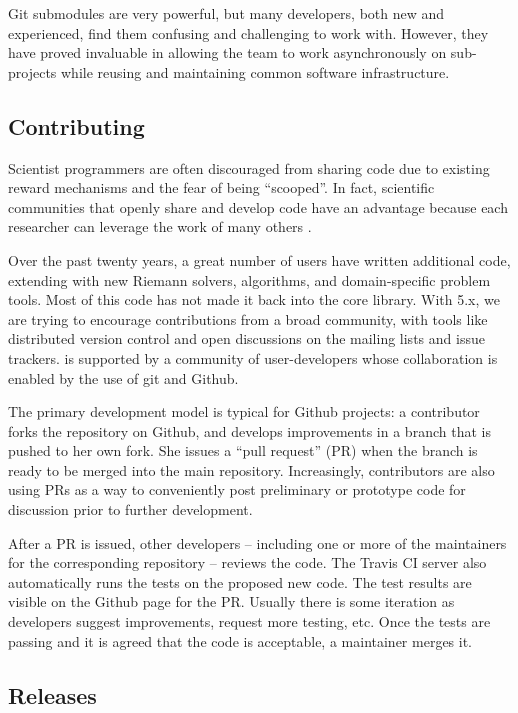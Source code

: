 Git submodules are very powerful, but many developers, both new and
experienced, find them confusing and challenging to work with.
However, they have proved invaluable in allowing the \clawpack team to
work asynchronously on sub-projects while reusing and maintaining
common software infrastructure.

\subsection{Contributing}


Scientist programmers are often discouraged from sharing code
due to existing reward mechanisms and the fear of being ``scooped''.
In fact, scientific communities that openly share and develop code
have an advantage because each researcher can leverage the work of
many others \cite{Turk:2013hd}.

Over the past twenty years, a great number of users have written
additional code, extending \clawpack with new Riemann solvers,
algorithms, and domain-specific problem tools.  Most of this code
has not made it back into the core library.  With \clawpack 5.x,
we are trying to encourage contributions from a broad community, with
tools like distributed version control and open discussions on 
the mailing lists and issue trackers.
\clawpack is supported by a community of user-developers whose
collaboration is enabled by the use of git and Github.



The primary development model
is typical for Github projects: a contributor forks the repository on Github,
and develops improvements in a branch that is pushed to her own fork.
She issues a ``pull request'' (PR) when the branch is ready to be merged
into the main repository.  Increasingly, contributors are also using
PRs as a way to conveniently post preliminary or prototype code for
discussion prior to further development.

After a PR is issued, other developers -- including one or more of the
maintainers for the corresponding repository -- reviews the code.  The Travis
CI server also automatically runs the tests on the proposed new code.  The test
results are visible on the Github page for the PR.  Usually there is some
iteration as developers suggest improvements, request more testing, etc.
Once the tests are passing and it is agreed that the code is acceptable, a
maintainer merges it.

\subsection{Releases}


